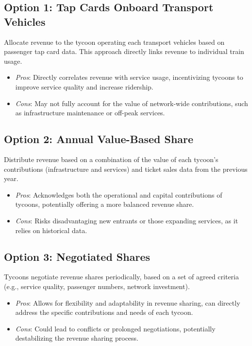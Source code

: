 \subsection*{Option 1: Tap Cards Onboard Transport Vehicles}
Allocate revenue to the tycoon operating each transport vehicles based on passenger tap card data. This approach directly links revenue to individual train usage.
\begin{itemize}
    \item \textit{Pros}: Directly correlates revenue with service usage, incentivizing tycoons to improve service quality and increase ridership.
    \item \textit{Cons}: May not fully account for the value of network-wide contributions, such as infrastructure maintenance or off-peak services.
\end{itemize}
    
\subsection*{Option 2: Annual Value-Based Share}
Distribute revenue based on a combination of the value of each tycoon's contributions (infrastructure and services) and ticket sales data from the previous year.
\begin{itemize}
    \item \textit{Pros}: Acknowledges both the operational and capital contributions of tycoons, potentially offering a more balanced revenue share.
    \item \textit{Cons}: Risks disadvantaging new entrants or those expanding services, as it relies on historical data.
\end{itemize}

\subsection*{Option 3: Negotiated Shares}
Tycoons negotiate revenue shares periodically, based on a set of agreed criteria (e.g., service quality, passenger numbers, network investment).
\begin{itemize}
    \item \textit{Pros}: Allows for flexibility and adaptability in revenue sharing, can directly address the specific contributions and needs of each tycoon.
    \item \textit{Cons}: Could lead to conflicts or prolonged negotiations, potentially destabilizing the revenue sharing process.
\end{itemize}

